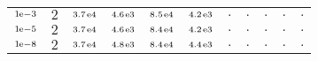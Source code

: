 \begin{tiny}
\begin{tabular}{@{$\;$}c@{$\;$}|@{$\;$}c@{$\;$}@{$\;$}c@{$\;$}@{$\;$}c@{$\;$}@{$\;$}c@{$\;$}@{$\;$}c@{$\;$}|@{$\;$}c@{$\;$}@{$\;$}c@{$\;$}@{$\;$}c@{$\;$}@{$\;$}c@{$\;$}@{$\;$}c@{$\;$}}
$\scriptstyle1\!\mathrm{\hspace{0.10em}e}-3$ & $\scriptstyle2$ & $\scriptstyle3.7\mathrm{\hspace{0.10em}e}4$ & $\scriptstyle4.6\mathrm{\hspace{0.10em}e}3$ & $\scriptstyle8.5\mathrm{\hspace{0.10em}e}4$ & $\scriptstyle4.2\mathrm{\hspace{0.10em}e}3$ & $\scriptstyle.$ & $\scriptstyle.$ & $\scriptstyle.$ & $\scriptstyle.$ & $\scriptstyle.$\\ 
$\scriptstyle1\!\mathrm{\hspace{0.10em}e}-5$ & $\scriptstyle2$ & $\scriptstyle3.7\mathrm{\hspace{0.10em}e}4$ & $\scriptstyle4.6\mathrm{\hspace{0.10em}e}3$ & $\scriptstyle8.4\mathrm{\hspace{0.10em}e}4$ & $\scriptstyle4.2\mathrm{\hspace{0.10em}e}3$ & $\scriptstyle.$ & $\scriptstyle.$ & $\scriptstyle.$ & $\scriptstyle.$ & $\scriptstyle.$\\ 
$\scriptstyle1\!\mathrm{\hspace{0.10em}e}-8$ & $\scriptstyle2$ & $\scriptstyle3.7\mathrm{\hspace{0.10em}e}4$ & $\scriptstyle4.8\mathrm{\hspace{0.10em}e}3$ & $\scriptstyle8.4\mathrm{\hspace{0.10em}e}4$ & $\scriptstyle4.4\mathrm{\hspace{0.10em}e}3$ & $\scriptstyle.$ & $\scriptstyle.$ & $\scriptstyle.$ & $\scriptstyle.$ & $\scriptstyle.$\\ 
\end{tabular} 
\end{tiny} 
